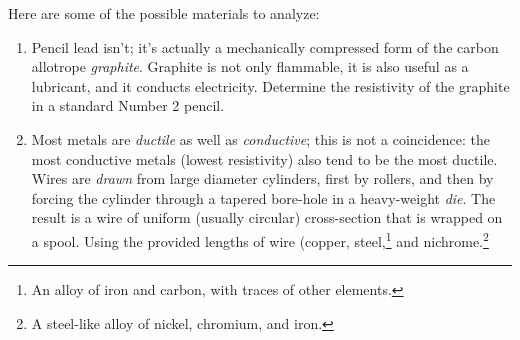 \documentclass[12pt]{article}
\begin{document}
Here are some of the possible materials to analyze:
\begin{enumerate}
\item Pencil lead isn't; it's actually a mechanically compressed form
  of the carbon allotrope \textit{graphite}.  Graphite is not only
  flammable, it is also useful as a lubricant, and it conducts
  electricity.  Determine the resistivity of the graphite in a
  standard Number 2 pencil.
\item Most metals are \textit{ductile} as well as \textit{conductive};
  this is not a coincidence: the most conductive metals (lowest
  resistivity) also tend to be the most ductile.  Wires are
  \textit{drawn} from large diameter cylinders, first by rollers, and
  then by forcing the cylinder through a tapered bore-hole in a
  heavy-weight \textit{die}.  The result is a wire of uniform (usually
  circular) cross-section that is wrapped on a spool.  Using the
  provided lengths of wire (copper, steel,\footnote{An alloy of iron
    and carbon, with traces of other elements.} and
  nichrome.\footnote{A steel-like alloy of nickel, chromium, and
    iron.}
\begin{figure}
  \centering
   \qquad
\end{figure}
\end{enumerate}
\end{document}
